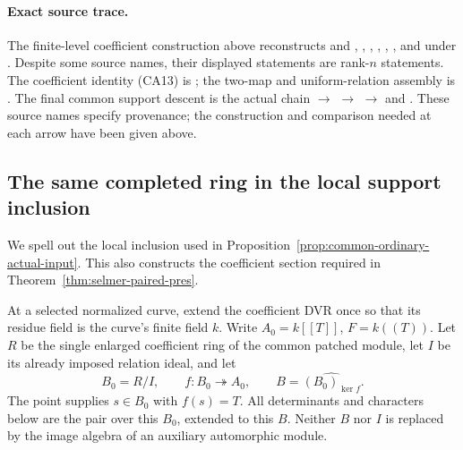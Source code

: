 \paragraph{Exact source trace.}
The finite-level coefficient construction above
reconstructs
 and
,
,
,
,
,
, and
under
.
Despite some source names, their displayed statements
are rank-\(n\) statements.
The coefficient identity (CA13) is
;
the two-map and uniform-relation assembly is
.
The final common support descent is the actual chain
\(\longrightarrow\)
\(\longrightarrow\)
\(\longrightarrow\)
and .
These source names specify provenance; the construction
and comparison needed at each arrow have been given above.

\subsection{The same completed ring in the local support inclusion}
\label{subsec:sr-same-completion-galout}

We spell out the local inclusion used in
Proposition~\ref{prop:common-ordinary-actual-input}.
This also constructs the coefficient section required in
Theorem~\ref{thm:selmer-paired-pres}.

At a selected normalized curve, extend the coefficient DVR once
so that its residue field is the curve's finite field \(k\).
Write \(A_0=k[[T]]\), \(F=k((T))\).
Let \(R\) be the single enlarged coefficient ring of the common
patched module, let \(I\) be its already imposed relation ideal,
and let
\[
 B_0=R/I,\qquad f:B_0\twoheadrightarrow A_0,\qquad
 B=\widehat{(B_0)_{\ker f}} .
\]
The point supplies \(s\in B_0\) with \(f(s)=T\).
All determinants and characters below are the pair over this
\(B_0\), extended to this \(B\).
Neither \(B\) nor \(I\) is replaced by the image algebra of an
auxiliary automorphic module.


